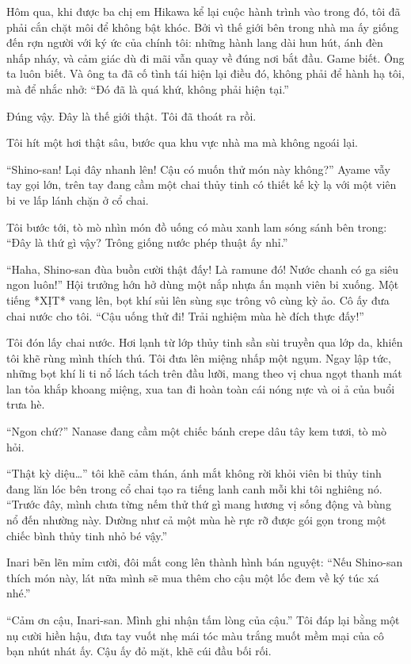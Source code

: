 \documentclass[../main.tex]{subfiles}
\begin{document}
Hôm qua, khi được ba chị em Hikawa kể lại cuộc hành trình vào trong đó, tôi đã phải cắn chặt môi để không bật khóc. Bởi vì thế giới bên trong nhà ma ấy giống đến rợn người với ký ức của chính tôi: những hành lang dài hun hút, ánh đèn nhấp nháy, và cảm giác dù đi mãi vẫn quay về đúng nơi bắt đầu. Game biết. Ông ta luôn biết. Và ông ta đã cố tình tái hiện lại điều đó, không phải để hành hạ tôi, mà để nhắc nhở: ``Đó đã là quá khứ, không phải hiện tại.''

Đúng vậy. Đây là thế giới thật. Tôi đã thoát ra rồi.

Tôi hít một hơi thật sâu, bước qua khu vực nhà ma mà không ngoái lại.

``Shino-san! Lại đây nhanh lên! Cậu có muốn thử món này không?'' Ayame vẫy tay gọi lớn, trên tay đang cầm một chai thủy tinh có thiết kế kỳ lạ với một viên bi ve lấp lánh chặn ở cổ chai.

Tôi bước tới, tò mò nhìn món đồ uống có màu xanh lam sóng sánh bên trong: ``Đây là thứ gì vậy? Trông giống nước phép thuật ấy nhỉ.''

``Haha, Shino-san đùa buồn cười thật đấy! Là ramune đó! Nước chanh có ga siêu ngon luôn!'' Hội trưởng hớn hở dùng một nắp nhựa ấn mạnh viên bi xuống. Một tiếng *XỊT* vang lên, bọt khí sủi lên sùng sục trông vô cùng kỳ ảo. Cô ấy đưa chai nước cho tôi. ``Cậu uống thử đi! Trải nghiệm mùa hè đích thực đấy!''

Tôi đón lấy chai nước. Hơi lạnh từ lớp thủy tinh sần sùi truyền qua lớp da, khiến tôi khẽ rùng mình thích thú. Tôi đưa lên miệng nhấp một ngụm. Ngay lập tức, những bọt khí li ti nổ lách tách trên đầu lưỡi, mang theo vị chua ngọt thanh mát lan tỏa khắp khoang miệng, xua tan đi hoàn toàn cái nóng nực và oi ả của buổi trưa hè.

``Ngon chứ?'' Nanase đang cầm một chiếc bánh crepe dâu tây kem tươi, tò mò hỏi.

``Thật kỳ diệu\dots'' tôi khẽ cảm thán, ánh mắt không rời khỏi viên bi thủy tinh đang lăn lóc bên trong cổ chai tạo ra tiếng lanh canh mỗi khi tôi nghiêng nó. ``Trước đây, mình chưa từng nếm thử thứ gì mang hương vị sống động và bùng nổ đến nhường này. Dường như cả một mùa hè rực rỡ được gói gọn trong một chiếc bình thủy tinh nhỏ bé vậy.''

Inari bẽn lẽn mỉm cười, đôi mắt cong lên thành hình bán nguyệt: ``Nếu Shino-san thích món này, lát nữa mình sẽ mua thêm cho cậu một lốc đem về ký túc xá nhé.''

``Cảm ơn cậu, Inari-san. Mình ghi nhận tấm lòng của cậu.'' Tôi đáp lại bằng một nụ cười hiền hậu, đưa tay vuốt nhẹ mái tóc màu trắng muốt mềm mại của cô bạn nhút nhát ấy. Cậu ấy đỏ mặt, khẽ cúi đầu bối rối.
\end{document}
